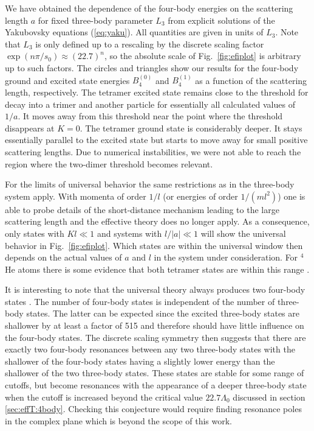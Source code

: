\documentclass[prc,preprint,showpacs,tightenlines,%
nofootinbib]{revtex4}
\begin{document}
We have obtained the dependence of the four-body energies on the 
scattering length $a$ for fixed three-body parameter $L_3$ from explicit  
solutions of the Yakubovsky equations (\ref{eq:yaku}).
All quantities are given  in units of $L_3$. Note that $L_3$ is
only defined up to a rescaling by the discrete scaling factor
$\exp(n\pi/s_0)\approx (22.7)^n$, so the absolute scale of 
Fig.~\ref{fig:efiplot} is arbitrary up to such factors. 
The circles and triangles show our results for the 
four-body ground and excited state energies $B_4^{(0)}$ and $B_4^{(1)}$
as a function of the scattering length, respectively.
The tetramer excited state remains close to the threshold
for decay into a trimer and another particle for essentially all
calculated values of $1/a$. It moves away from this threshold 
near the point  where the threshold disappears at $K=0$.
The tetramer ground state is considerably deeper. It stays essentially
parallel to the excited state but starts to move away for small positive
scattering lengths. 
Due to numerical instabilities, we were not able to reach
the region where the two-dimer threshold becomes relevant. 


For the limits of universal behavior the same restrictions as
in the three-body system apply.
With momenta of order $1/l$ (or energies of order
$1/(ml^2)$) one is able to probe details
of the short-distance mechanism leading to the large scattering
length and the effective theory does no longer apply.
As a consequence, only states with $Kl \ll 1$ and 
systems with $l/|a| \ll 1$ will show the universal behavior 
in Fig.~\ref{fig:efiplot}. Which states are within the universal window
then depends on the actual values of $a$ and $l$ in the system under 
consideration. For $^4$He atoms
there is some evidence that both tetramer states are within this 
range \cite{Platter04}.


It is interesting to note that the universal theory
always produces two  four-body states \cite{Lucthesis}. 
The number of four-body states is independent of the number of three-body
states. The latter can be expected since the excited three-body states are 
shallower by at least a factor of 515 and therefore should have 
little influence on the four-body states. The discrete scaling
symmetry then suggests that there are exactly two four-body resonances
between any two three-body states with the shallower of the four-body states
having a slightly lower energy than the shallower of the two three-body 
states. These states are stable for some range of cutoffs, but become 
resonances with the appearance of a deeper three-body state when the cutoff
is increased beyond the critical value $22.7 \Lambda_0$ discussed
in section  \ref{sec:effT:4body}.
Checking this conjecture would require finding resonance poles
in the complex plane which is beyond the scope of this work.
\end{document}
